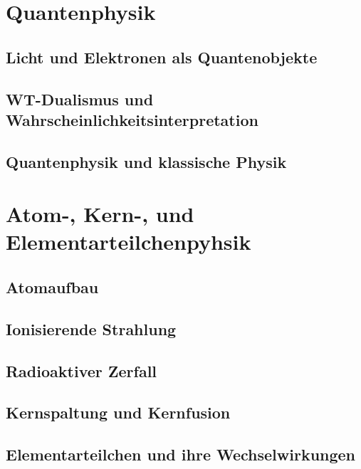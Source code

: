 \documentclass[12pt]{article}
\begin{document}
\section{Quantenphysik}
    \subsection{Licht und Elektronen als Quantenobjekte}
    \subsection{WT-Dualismus und Wahrscheinlichkeitsinterpretation}
    \subsection{Quantenphysik und klassische Physik}

\section{Atom-, Kern-, und Elementarteilchenpyhsik}
    \subsection{Atomaufbau}
    \subsection{Ionisierende Strahlung}
    \subsection{Radioaktiver Zerfall}
    \subsection{Kernspaltung und Kernfusion}
    \subsection{Elementarteilchen und ihre Wechselwirkungen}
\end{document}
